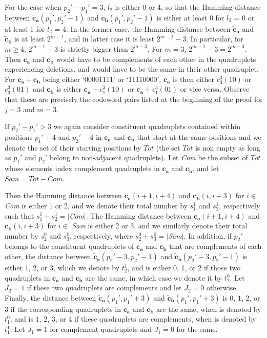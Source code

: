 For the case when $p_2'-p_1'=3$, $l_2$ is either 0 or 4, so that
the Hamming distance between $\mathbf{\tilde{c}_a}(p_1',p_2'-1)$
and $\mathbf{\tilde{c}_b}(p_1',p_2'-1)$ is either at least 0 for
$l_2$ = 0 or at least 1 for $l_2$ = 4. In the former case, the
Hamming distance between $\mathbf{\tilde{c}_a}$ and
$\mathbf{\tilde{c}_b}$ is at least $2^{m-1}$, and in latter case
it is least $2^{m-1}-3$. In particular, for $m\geq 4$, $2^{m-1}-3$
is strictly bigger than $2^{m-3}$. For $m=3$, $2^{m-1}-3=
2^{m-3}$. Then $\mathbf{c_a}$ and $\mathbf{c_b}$ would have to be
complements of each other in the quadruplets experiencing
deletions, and would have to be the same in their other
quadruplet. For $\mathbf{c_a}+\mathbf{c_b}$ being either
`00001111' or `11110000', $\mathbf{c_a}$ is then either
$c_3^3(10)$ or $c_3^3(01)$ and $\mathbf{c_b}$ is either
$\mathbf{c_a}+c_1^3(10)$ or $\mathbf{c_a}+c_1^3(01)$ or vice
versa. Observe that these are precisely the codeword pairs listed
at the beginning of the proof for $j=3$ and $m=3$.

If $p_2'-p_1'>3$ we again consider constituent quadruplets
contained within positions $p_1'+4$ and $p_2'-4$ in $\mathbf{c_a}$
and $\mathbf{c_b}$ that start at the same positions and we denote
the set of their starting positions by $Tot$ (the set $Tot$ is non
empty as long as $p_1'$ and $p_2'$ belong to non-adjacent
quadruplets). Let \textit{Com} be the subset of $Tot$ whose
elements index complement quadruplets in $\mathbf{c_a}$ and
$\mathbf{c_b}$, and let $Sam=Tot-Com$.

Then the Hamming distance between $\mathbf{c_a}(i+1,i+4)$ and
$\mathbf{c_b}(i,i+3)$ for $i \in$ \textit{Com} is either 1 or 2,
and we denote their total number by $s_{1}^1$ and $s_{2}^1$,
respectively such that $s_{1}^1+s_{2}^1=|$\textit{Com}$|$. The
Hamming distance between $\mathbf{c_a}(i+1,i+4)$ and
$\mathbf{c_b}(i,i+3)$ for $i \in$ \textit{Sam} is either 2 or 3,
and we similarly denote their total number by $s_{2}^0$ and
$s_{3}^0$, respectively, where $s_{2}^0+s_{3}^0=|$\textit{Sam}$|$.
In addition, if $p_2'$ belongs to the constituent quadruplets of
$\mathbf{c_a}$ and $\mathbf{c_b}$ that are complements of each
other, the distance between $\mathbf{\tilde{c}_a}(p_2'-3,p_2'-1)$
and $\mathbf{\tilde{c}_b}(p_2'-3,p_2'-1)$ is either 1, 2, or 3,
which we denote by $t_2^1$, and is either 0, 1, or 2 if those two
quadruplets in $\mathbf{c_a}$ and $\mathbf{c_b}$ are the same, in
which case we denote it by $t_2^0$. Let $J_2=1$ if these two
quadruplets are complements and let $J_2=0$ otherwise. Finally,
the distance between $\mathbf{\tilde{c}_a}(p_1',p_1'+3)$ and
$\mathbf{\tilde{c}_b}(p_1',p_1'+3)$ is $0$, $1$, $2$, or $3$ if
the corresponding quadruplets in $\mathbf{c_a}$ and $\mathbf{c_b}$
are the same, when is denoted by $t_1^0$, and  is $1$, $2$, $3$,
or $4$ if these quadruplets are complements, when is denoted by
$t_1^1$. Let $J_1=1$ for complement quadruplets and $J_1=0$ for
the same.

